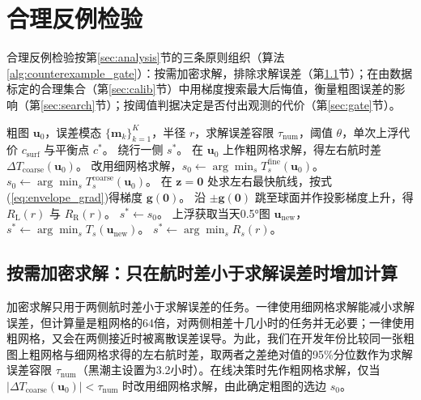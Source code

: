 \section{合理反例检验}
\label{sec:method}

合理反例检验按第\ref{sec:analysis}节的三条原则组织（算法\ref{alg:counterexample_gate}）：按需加密求解，排除求解误差（第\ref{sec:numeric}节）；在由数据标定的合理集合（第\ref{sec:calib}节）中用梯度搜索最大后悔值，衡量粗图误差的影响（第\ref{sec:search}节）；按阈值判据决定是否付出观测的代价（第\ref{sec:gate}节）。

\begin{algorithm}[t]
\caption{基于合理反例检验的选边决策}
\label{alg:counterexample_gate}
\begin{algorithmic}[1]
\Require 粗图 $\boldsymbol{u}_0$，误差模态 $\{\boldsymbol{m}_k\}_{k=1}^{K}$，半径 $r$，求解误差容限 $\tau_{\text{num}}$，阈值 $\theta$，单次上浮代价 $c_{\text{surf}}$ 与平衡点 $c^*$。
\Ensure 绕行一侧 $s^*$。
\State 在 $\boldsymbol{u}_0$ 上作粗网格求解，得左右航时差 $\Delta T_{\text{coarse}}(\boldsymbol{u}_0)$。
    \State 改用细网格求解，$s_0 \gets \arg\min_{s} T_s^{\text{fine}}(\boldsymbol{u}_0)$。
\Else
    \State $s_0 \gets \arg\min_{s} T_s^{\text{coarse}}(\boldsymbol{u}_0)$。
\EndIf
\State 在 $\boldsymbol{z}=\boldsymbol{0}$ 处求左右最快航线，按式(\ref{eq:envelope_grad})得梯度 $\boldsymbol{g}(\boldsymbol{0})$。
\State 沿 $\pm\boldsymbol{g}(\boldsymbol{0})$ 跳至球面并作投影梯度上升，得 $R_{\text{L}}(r)$ 与 $R_{\text{R}}(r)$。
    \State \Return $s^* \gets s_0$。
    \State 上浮获取当天0.5°图 $\boldsymbol{u}_{\text{new}}$，\Return $s^* \gets \arg\min_{s} T_s(\boldsymbol{u}_{\text{new}})$。
\Else
    \State \Return $s^* \gets \arg\min_{s} R_s(r)$。
\EndIf
\end{algorithmic}
\end{algorithm}

\subsection{按需加密求解：只在航时差小于求解误差时增加计算}
\label{sec:numeric}
加密求解只用于两侧航时差小于求解误差的任务。一律使用细网格求解能减小求解误差，但计算量是粗网格的64倍，对两侧相差十几小时的任务并无必要；一律使用粗网格，又会在两侧接近时被离散误差误导。为此，我们在开发年份比较同一张粗图上粗网格与细网格求得的左右航时差，取两者之差绝对值的95\%分位数作为求解误差容限 $\tau_{\text{num}}$（黑潮主设置为3.2小时）。在线决策时先作粗网格求解，仅当 $|\Delta T_{\text{coarse}}(\boldsymbol{u}_0)| < \tau_{\text{num}}$ 时改用细网格求解，由此确定粗图的选边 $s_0$。

